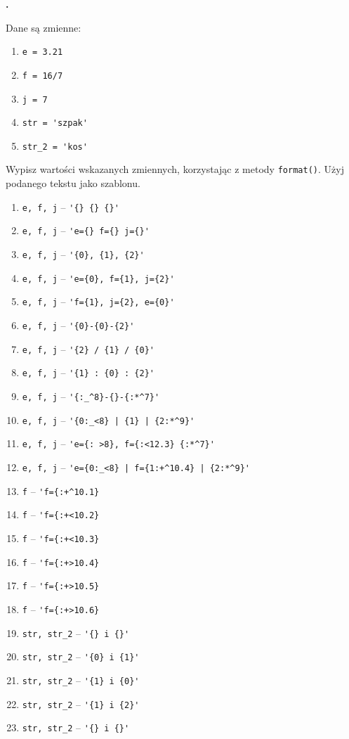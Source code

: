 \documentclass[a4paper]{article}
\begin{document}
\textbf{.}\addtocounter{zadanie}{1} Dane są zmienne:
\begin{enumerate}[]
    \item \verb|e = 3.21|
    \item \verb|f = 16/7|
    \item \verb|j = 7|
    \item \verb|str = 'szpak'|
    \item \verb|str_2 = 'kos'|
\end{enumerate}

Wypisz wartości wskazanych zmiennych, korzystając z metody \verb|format()|. Użyj podanego tekstu jako szablonu.

\begin{enumerate}[label=\arabic*.]
    \item \verb|e, f, j| -- \verb|'{} {} {}'|
    \item \verb|e, f, j| -- \verb|'e={} f={} j={}'|

    \item \verb|e, f, j| -- \verb|'{0}, {1}, {2}'|
    \item \verb|e, f, j| -- \verb|'e={0}, f={1}, j={2}'|

    \item \verb|e, f, j| -- \verb|'f={1}, j={2}, e={0}'|
    \item \verb|e, f, j| -- \verb|'{0}-{0}-{2}'|
    \item \verb|e, f, j| -- \verb|'{2} / {1} / {0}'|
    \item \verb|e, f, j| -- \verb|'{1} : {0} : {2}'|

    \item \verb|e, f, j| -- \verb|'{:_^8}-{}-{:*^7}'|
    \item \verb|e, f, j| -- \verb-'{0:_<8} | {1} | {2:*^9}'-

    \item \verb|e, f, j| -- \verb|'e={: >8}, f={:<12.3} {:*^7}'|
    \item \verb|e, f, j| -- \verb-'e={0:_<8} | f={1:+^10.4} | {2:*^9}'-

    \item \verb|f| -- \verb|'f={:+^10.1}|
    \item \verb|f| -- \verb|'f={:+<10.2}|
    \item \verb|f| -- \verb|'f={:+<10.3}|
    \item \verb|f| -- \verb|'f={:+>10.4}|
    \item \verb|f| -- \verb|'f={:+>10.5}|
    \item \verb|f| -- \verb|'f={:+>10.6}|

    \item \verb|str, str_2| -- \verb|'{} i {}'|
    \item \verb|str, str_2| -- \verb|'{0} i {1}'|
    \item \verb|str, str_2| -- \verb|'{1} i {0}'|
    \item \verb|str, str_2| -- \verb|'{1} i {2}'|
    \item \verb|str, str_2| -- \verb|'{} i {}'|

\end{enumerate}
\end{document}
